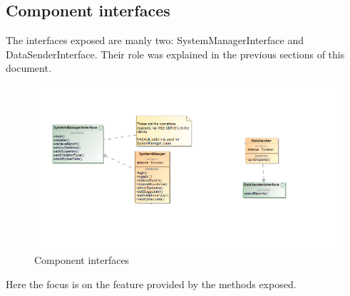 \subsection{Component interfaces}

The interfaces exposed are manly two: SystemManagerInterface and DataSenderInterface. Their role was explained in the previous sections of this document.

\begin{figure}[H]
	\centering
	\includegraphics[width=1.12\linewidth]{Images/ComponentInterfaces.png}
	\caption{Component interfaces}
\end{figure}


Here the focus is on the feature provided by the methods exposed.


